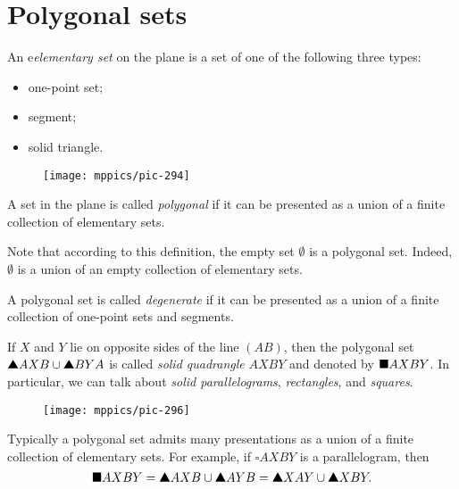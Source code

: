 \section{Polygonal sets}

An e\emph{elementary set} on the plane 
is a set of one of the following three types:
\begin{itemize}
 \item one-point set;
 \item segment;
 \item solid triangle.
\end{itemize}

\begin{wrapfigure}{r}{24 mm}
\vskip-12mm
\centering
\texttt{[image: mppics/pic-294]}
\end{wrapfigure}

A set in the plane is called \emph{polygonal} if it can be presented as a union of a finite collection of elementary sets.

Note that according to this definition, the empty set $\emptyset$
is a polygonal set.
Indeed, $\emptyset$ is a union of an empty collection of elementary sets.

A polygonal set is called \emph{degenerate} if it can be presented as a union of a finite collection of one-point sets and segments.

If $X$ and $Y$ lie on opposite sides of the line $(AB)$,
then the polygonal set
$\solidtriangle AXB\cup \solidtriangle BYA$
is called \emph{solid quadrangle} $AXBY$ and denoted by 
$\blacksquare AXBY$.
In particular, 
we can talk about \emph{solid parallelograms}, \emph{rectangles}, and \emph{squares}.

\begin{wrapfigure}{o}{38 mm}
\centering
\texttt{[image: mppics/pic-296]}
\end{wrapfigure}

Typically a polygonal set admits many 
presentations as a union of a finite collection of elementary sets.
For example, if $\square AXBY$ is a parallelogram, then
\[\solidsquare AXBY=\solidtriangle AXB\cup \solidtriangle AYB=\solidtriangle XAY\cup \solidtriangle XBY.\]

